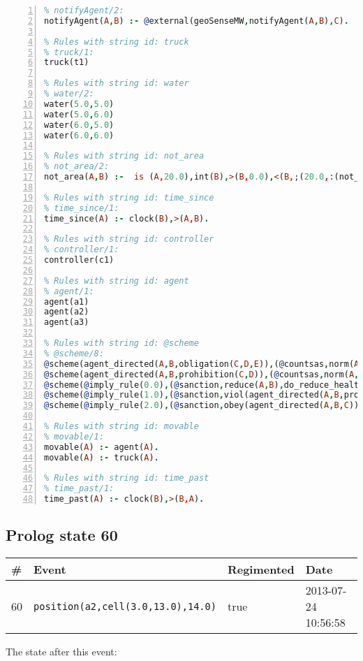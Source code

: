 \documentclass[11pt]{article}\usepackage[utf8]{inputenc}\usepackage{geometry}
\begin{document}
\begin{lstlisting}[language=Prolog, numbers=left]
% Rules with string id: notifyAgent
% notifyAgent/2:
notifyAgent(A,B) :- @external(geoSenseMW,notifyAgent(A,B),C).

% Rules with string id: truck
% truck/1:
truck(t1)

% Rules with string id: water
% water/2:
water(5.0,5.0)
water(5.0,6.0)
water(6.0,5.0)
water(6.0,6.0)

% Rules with string id: not_area
% not_area/2:
not_area(A,B) :-  is (A,20.0),int(B),>(B,0.0),<(B,;(20.0,:(not_area(A,B), is (-(B),20.0)))),int(A),>(A,0.0),<(A,;(20.0,:(area(A,B),-(int(A))))),int(B),>(A,0.0),>(B,0.0),<(A,21.0),<(B,21.0).

% Rules with string id: time_since
% time_since/1:
time_since(A) :- clock(B),>(A,B).

% Rules with string id: controller
% controller/1:
controller(c1)

% Rules with string id: agent
% agent/1:
agent(a1)
agent(a2)
agent(a3)

% Rules with string id: @scheme
% @scheme/8:
@scheme(agent_directed(A,B,obligation(C,D,E)),(@countsas,norm(A,B,F,obligation(C,D,E)),F),false,(listTrue(C)),(time_past(D)),false,[plus(viol(agent_directed(A,B,obligation(C,D,E))))|[]],[plus(obey(agent_directed(A,B,obligation(C,D,E))))|[]])
@scheme(agent_directed(A,B,prohibition(C,D)),(@countsas,norm(A,B,E,prohibition(C,D)),E),(listTrue(C)),false,(false),false,[plus(viol(agent_directed(A,B,prohibition(C,D))))|[]],[plus(obey(agent_directed(A,B,prohibition(C,D))))|[]])
@scheme(@imply_rule(0.0),(@sanction,reduce(A,B),do_reduce_health(A,B),notifyAgent(A,changed(status))),true,false,false,false,[min(reduce(A,B))|[]],[])
@scheme(@imply_rule(1.0),(@sanction,viol(agent_directed(A,B,prohibition(C,D))),do_sanction(D)),true,false,false,false,[min(viol(agent_directed(A,B,prohibition(C,D))))|[]],[])
@scheme(@imply_rule(2.0),(@sanction,obey(agent_directed(A,B,C))),true,false,false,false,[min(obey(agent_directed(A,B,C)))|[]],[])

% Rules with string id: movable
% movable/1:
movable(A) :- agent(A).
movable(A) :- truck(A).

% Rules with string id: time_past
% time_past/1:
time_past(A) :- clock(B),>(B,A).

\end{lstlisting}
\clearpage 
\subsection{Prolog state 60}
\begin{table}[ht]
\centering 
\begin{tabular}{l l l l} 
\textbf{\#} & \textbf{Event} & \textbf{Regimented} & \textbf{Date} \\ [0.5ex] 
\hline
60&\texttt{position(a2,cell(3.0,13.0),14.0)}&true&2013-07-24 10:56:58\\ [1ex] \hline\end{tabular}
\end{table}
The state after this event:
\end{document}
